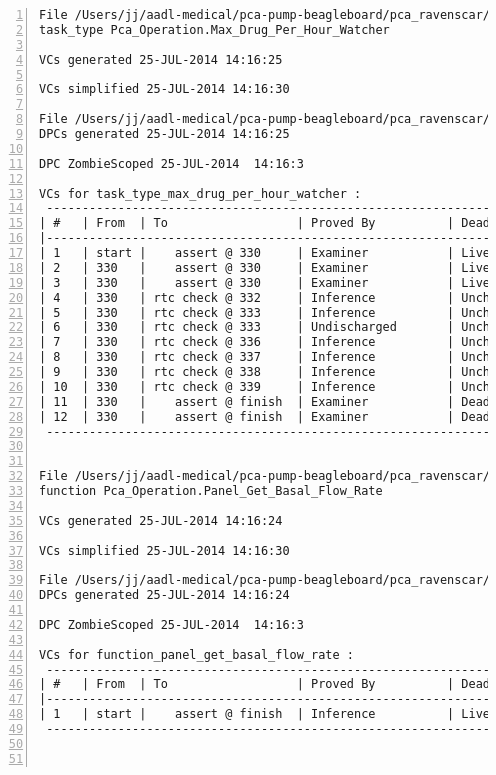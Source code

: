 \begin{lstlisting}[gobble=0, numbers=left, caption={POGS report for PCA Pump prototype}, label={listing:pca_ravenscar:pogs_full}]
File /Users/jj/aadl-medical/pca-pump-beagleboard/pca_ravenscar/pca_operation/max_drug_per_hour_watcher.vcg
task_type Pca_Operation.Max_Drug_Per_Hour_Watcher

VCs generated 25-JUL-2014 14:16:25

VCs simplified 25-JUL-2014 14:16:30

File /Users/jj/aadl-medical/pca-pump-beagleboard/pca_ravenscar/pca_operation/max_drug_per_hour_watcher.dpc
DPCs generated 25-JUL-2014 14:16:25

DPC ZombieScoped 25-JUL-2014  14:16:3

VCs for task_type_max_drug_per_hour_watcher :
 -----------------------------------------------------------------------------
| #   | From  | To                  | Proved By          | Dead Path | Status |
|-----------------------------------------------------------------------------
| 1   | start |    assert @ 330     | Examiner           | Live      |   EL   |
| 2   | 330   |    assert @ 330     | Examiner           | Live      |   EL   |
| 3   | 330   |    assert @ 330     | Examiner           | Live      |   EL   |
| 4   | 330   | rtc check @ 332     | Inference          | Unchecked |   IU   |
| 5   | 330   | rtc check @ 333     | Inference          | Unchecked |   IU   |
| 6   | 330   | rtc check @ 333     | Undischarged       | Unchecked |   UU   |
| 7   | 330   | rtc check @ 336     | Inference          | Unchecked |   IU   |
| 8   | 330   | rtc check @ 337     | Inference          | Unchecked |   IU   |
| 9   | 330   | rtc check @ 338     | Inference          | Unchecked |   IU   |
| 10  | 330   | rtc check @ 339     | Inference          | Unchecked |   IU   |
| 11  | 330   |    assert @ finish  | Examiner           | Dead      |   ED   |
| 12  | 330   |    assert @ finish  | Examiner           | Dead      |   ED   |
 -----------------------------------------------------------------------------


File /Users/jj/aadl-medical/pca-pump-beagleboard/pca_ravenscar/pca_operation/panel_get_basal_flow_rate.vcg
function Pca_Operation.Panel_Get_Basal_Flow_Rate

VCs generated 25-JUL-2014 14:16:24

VCs simplified 25-JUL-2014 14:16:30

File /Users/jj/aadl-medical/pca-pump-beagleboard/pca_ravenscar/pca_operation/panel_get_basal_flow_rate.dpc
DPCs generated 25-JUL-2014 14:16:24

DPC ZombieScoped 25-JUL-2014  14:16:3

VCs for function_panel_get_basal_flow_rate :
 -----------------------------------------------------------------------------
| #   | From  | To                  | Proved By          | Dead Path | Status |
|-----------------------------------------------------------------------------
| 1   | start |    assert @ finish  | Inference          | Live      |   IL   |
 -----------------------------------------------------------------------------



\end{lstlisting}
